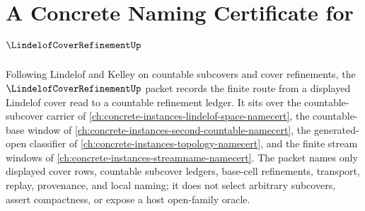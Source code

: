 \chapter{A Concrete Naming Certificate for $\LindelofCoverRefinementUp$}
\label{ch:concrete-instances-lindelof-cover-refinement-namecert}

Following Lindelof and Kelley on countable subcovers and cover refinements, the $\LindelofCoverRefinementUp$ packet records the finite route from a displayed Lindelof cover read to a countable refinement ledger. It sits over the countable-subcover carrier of \autoref{ch:concrete-instances-lindelof-space-namecert}, the countable-base window of \autoref{ch:concrete-instances-second-countable-namecert}, the generated-open classifier of \autoref{ch:concrete-instances-topology-namecert}, and the finite stream windows of \autoref{ch:concrete-instances-streamname-namecert}. The packet names only displayed cover rows, countable subcover ledgers, base-cell refinements, transport, replay, provenance, and local naming; it does not select arbitrary subcovers, assert compactness, or expose a host open-family oracle.

